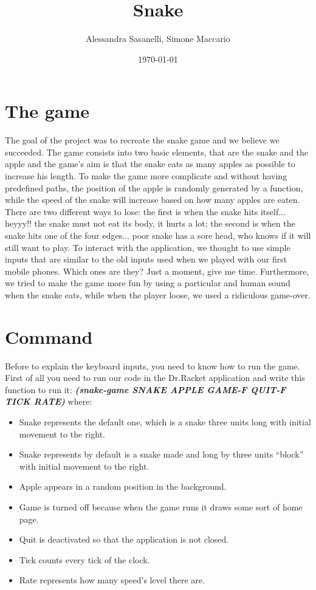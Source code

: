 \documentclass{article}
\title{Snake}
\author{Alessandra Sasanelli, Simone Maccario}
\date{\today}
\begin{document}
	\maketitle
	
	\section{The game}
	
	The goal of the project was to recreate the snake game and we believe we succeeded.
	The game consists into two basic elements, that are the snake and the apple and the game's aim is that the snake eats as many apples as possible to increase his length.
	To make the game more complicate and without having predefined paths, the position of the apple is randomly generated by a function, while the speed of the snake will increase based on how many apples are eaten.
	There are two different ways to lose: the first is when the snake hits itself... heyyy!! the snake must not eat its body, it hurts a lot; the second is when the snake hits one of the four edges... poor snake has a sore head, who knows if it will still want to play.
	To interact with the application, we thought to use simple inputs that are similar to the old inputs used when we played with our first mobile phones. Which ones are they? Just a moment, give me time.
	Furthermore, we tried to make the game more fun by using a particular and human sound when the snake eats, while when the player loose, we used a ridiculous game-over.
	
	\section{Command}	
	
	Before to explain the keyboard inputs, you need to know how to run the game. First of all you need to run our code in the Dr.Racket application and write this function to run it: \textbf{\emph{(snake-game SNAKE APPLE GAME-F QUIT-F TICK RATE)}} where:
	
	\begin{itemize}
		\item Snake represents the default one, which is a snake three units long with initial movement to the right.
		\item Snake represents by default is a snake made and long by three units “block” with initial movement to the right.
		\item Apple appears in a random position in the background.
		\item Game is turned off because when the game runs it draws some sort of home page.
		\item Quit is deactivated so that the application is not closed.
		\item Tick counts every tick of the clock.
		\item Rate represents how many speed's level there are.
	\end{itemize}
	
\end{document}
